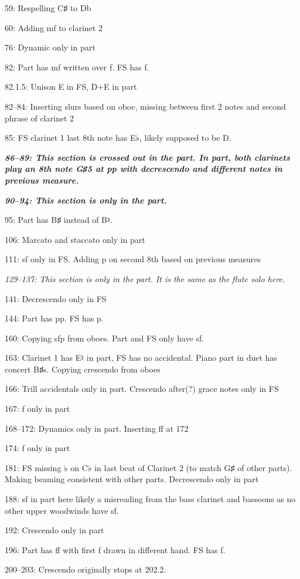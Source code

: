 \documentclass[twoside]{article}
\begin{document}
\begin{hangparas}{15pt}{1}
\begin{multicols}{2}
59: Respelling C♯ to Db

60: Adding mf to clarinet 2

76: Dynamic only in part

82: Part has mf written over f. FS has f.

82.1.5: Unison E in FS, D+E in part

82--84: Inserting slurs based on oboe, missing between first 2 notes and second phrase of clarinet 2

85: FS clarinet 1 last 8th note has E♭, likely supposed to be D.

\textbf{\textit{86--89: This section is crossed out in the part. In part, both clarinets play an 8th note G♯5 at pp with decrescendo and different notes in previous measure.}}

\textbf{\textit{90--94: This section is only in the part.}}

95: Part has B♯ instead of B♮.

106: Marcato and staccato only in part

111: sf only in FS. Adding p on second 8th based on previous measures

\textit{129--137: This section is only in the part. It is the same as the flute solo here.}

141: Decrescendo only in FS

144: Part has pp. FS has p.

160: Copying sfp from oboes. Part and FS only have sf.

163: Clarinet 1 has E♮ in part, FS has no accidental. Piano part in duet has concert B♯s. Copying crescendo from oboes

166: Trill accidentals only in part. Crescendo after(?) grace notes only in FS

167: f only in part

168--172: Dynamics only in part. Inserting ff at 172

174: f only in part

181: FS missing ♭ on C♭ in last beat of Clarinet 2 (to match G♯ of other parts). Making beaming consistent with other parts. Decrescendo only in part

188: sf in part here likely a misreading from the bass clarinet and bassoons as no other upper woodwinds have sf.

192: Crescendo only in part

196: Part has ff with first f drawn in different hand. FS has f.

200--203: Crescendo originally stops at 202.2.


\end{multicols}
\end{hangparas}
\end{document}
